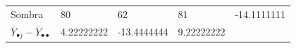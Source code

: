 \documentclass[]{book}
\theoremstyle{definition}
\theoremstyle{definition}
\theoremstyle{definition}
\theoremstyle{remark}
\begin{document}
\begin{longtable}[]{@{}lllll@{}}
\begin{minipage}[t]{0.18\columnwidth}
Sombra\strut
\end{minipage} & \begin{minipage}[t]{0.06\columnwidth}\raggedright
80\strut
\end{minipage} & \begin{minipage}[t]{0.07\columnwidth}\raggedright
62\strut
\end{minipage} & \begin{minipage}[t]{0.06\columnwidth}\raggedright
81\strut
\end{minipage} & \begin{minipage}[t]{0.49\columnwidth}\raggedright
-14.1111111\strut
\end{minipage}\tabularnewline
\begin{minipage}[t]{0.18\columnwidth}\raggedright
\(\overline{Y}_{\bullet j} - \overline{Y}_{\bullet \bullet}\)\strut
\end{minipage} & \begin{minipage}[t]{0.06\columnwidth}\raggedright
4.22222222\strut
\end{minipage} & \begin{minipage}[t]{0.07\columnwidth}\raggedright
-13.4444444\strut
\end{minipage} & \begin{minipage}[t]{0.06\columnwidth}\raggedright
9.22222222\strut
\end{minipage} & \begin{minipage}[t]{0.49\columnwidth}\raggedright
\strut
\end{minipage}\tabularnewline
\bottomrule
\end{longtable}
\end{document}
